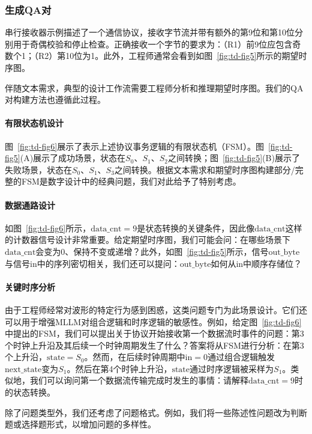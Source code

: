 \subsubsection{生成QA对}

串行接收器示例描述了一个通信协议，接收字节流并带有额外的第9位和第10位分别用于奇偶校验和停止检查。正确接收一个字节的要求为：（R1）前9位应包含奇数个1；（R2）第10位为1。此外，工程师通常会看到如图~\ref{fig:td-fig5}所示的期望时序图。

伴随文本需求，典型的设计工作流需要工程师分析和推理期望时序图。我们的QA对构建方法也遵循此过程。

\paragraph{有限状态机设计}
图~\ref{fig:td-fig6}展示了表示上述协议事务逻辑的有限状态机（FSM）。图~\ref{fig:td-fig5}(A)展示了成功场景，状态在$S_0$、$S_1$、$S_2$之间转换；图~\ref{fig:td-fig5}(B)展示了失败场景，状态在$S_0$、$S_1$、$S_3$之间转换。根据文本需求和期望时序图构建部分/完整的FSM是数字设计中的经典问题，我们对此给予了特别考虑。

\paragraph{数据通路设计}
如图~\ref{fig:td-fig6}所示，$\text{data\_cnt}=9$是状态转换的关键条件，因此像$\text{data\_cnt}$这样的计数器信号设计非常重要。给定期望时序图，我们可能会问：在哪些场景下$\text{data\_cnt}$会变为0、保持不变或递增？此外，如图~\ref{fig:td-fig5}所示，信号$\text{out\_byte}$与信号$\text{in}$中的序列密切相关，我们还可以提问：$\text{out\_byte}$如何从$\text{in}$中顺序存储位？

\paragraph{关键时序分析}
由于工程师经常对波形的特定行为感到困惑，这类问题专门为此场景设计。它们还可以用于增强MLLM对组合逻辑和时序逻辑的敏感性。例如，给定图~\ref{fig:td-fig6}中提出的FSM，我们可以提出关于协议开始接收第一个数据流时事件的问题：第3个时钟上升沿及其后续一个时钟周期发生了什么？答案将从FSM进行分析：在第3个上升沿，$\text{state}=S_0$。然而，在后续时钟周期中$\text{in}=0$通过组合逻辑触发$\text{next\_state}$变为$S_1$。然后在第4个时钟上升沿，$\text{state}$通过时序逻辑被采样为$S_1$。类似地，我们可以询问第一个数据流传输完成时发生的事情：请解释$\text{data\_cnt}=9$时的状态转换。

除了问题类型外，我们还考虑了问题格式。例如，我们将一些陈述性问题改为判断题或选择题形式，以增加问题的多样性。

